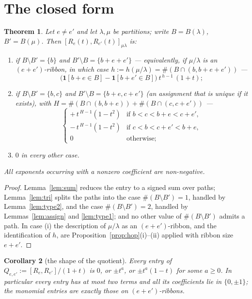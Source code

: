 \documentclass[11pt]{article}
\newtheorem{theorem}{Theorem}
\newtheorem{corollary}[theorem]{Corollary}
\theoremstyle{definition}
\newcommand{\one}{\mathbf{1}}
\begin{document}
\section{The closed form}

\begin{theorem}\label{thm:main}
Let $e\ne e'$ and let $\lambda,\mu$ be partitions; write $B=B(\lambda)$, $B'=B(\mu)$. Then
$[R_e(t),R_{e'}(t)]_{\mu\lambda}$ is:
\begin{enumerate}
\item[\rm(i)] if $B\setminus B'=\{b\}$ and $B'\setminus B=\{b+e+e'\}$ --- equivalently, if
$\mu/\lambda$ is an $(e+e')$-ribbon, in which case $h:=h(\mu/\lambda)=\#(B\cap(b,b+e+e'))$ ---
\[
\bigl(\one[b+e\in B]-\one[b+e'\in B]\bigr)\ t^{\,h-1}\,(1+t);
\]
\item[\rm(ii)] if $B\setminus B'=\{b,c\}$ and $B'\setminus B=\{b+e,c+e'\}$ (an assignment that is
unique if it exists), with $H=\#(B\cap(b,b+e))+\#(B\cap(c,c+e'))$ ---
\[
\begin{cases}
+\,t^{\,H-1}(1-t^2)&\text{if }b<c<b+e<c+e',\\
-\,t^{\,H-1}(1-t^2)&\text{if }c<b<c+e'<b+e,\\
0&\text{otherwise;}
\end{cases}
\]
\item[\rm(iii)] $0$ in every other case.
\end{enumerate}
All exponents occurring with a nonzero coefficient are non-negative.
\end{theorem}

\begin{proof}
Lemma~\ref{lem:sum} reduces the entry to a signed sum over paths; Lemma~\ref{lem:tri} splits the
paths into the case $\#(B\setminus B')=1$, handled by Lemma~\ref{lem:type2}, and the case
$\#(B\setminus B')=2$, handled by Lemmas~\ref{lem:assign} and \ref{lem:type1}; and no other value
of $\#(B\setminus B')$ admits a path. In case (i) the description of $\mu/\lambda$ as an
$(e+e')$-ribbon, and the identification of $h$, are Proposition~\ref{prop:hop}(i)--(ii) applied
with ribbon size $e+e'$.
\end{proof}

\begin{corollary}[the shape of the quotient]\label{cor:shape}
Every entry of $Q_{e,e'}:=[R_e,R_{e'}]/(1+t)$ is $0$, or $\pm t^{a}$, or $\pm t^{a}(1-t)$ for
some $a\ge0$. In particular every entry has at most two terms and all its coefficients lie in
$\{0,\pm1\}$; the monomial entries are exactly those on $(e+e')$-ribbons.
\end{corollary}
\end{document}
